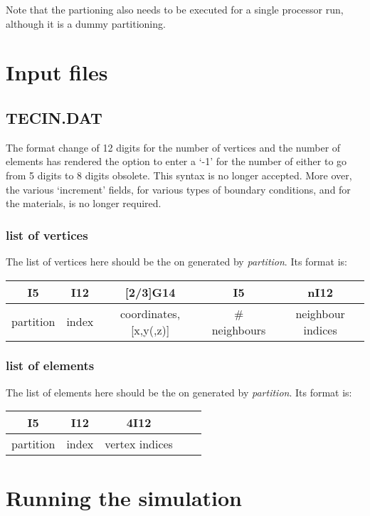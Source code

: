\documentclass{article}
\begin{document}
Note that the partioning also needs to be executed for a single processor run, although it is a dummy partitioning.


\section{Input files}


\subsection{TECIN.DAT}

The format change of 12 digits for the number of vertices and the number of elements has rendered
the option to enter a `-1' for the number of either to go from 5 digits to 8 digits obsolete.
This syntax is no longer accepted. More over, the various `increment' fields, for various types of boundary conditions, and for the materials,
is no longer required.


\subsubsection{list of vertices}

The list of vertices here should be the on generated by \textit{partition}. Its format is:

\begin{tabular}{|c|c|c|c|c|}
\hline
I5 & I12 & [2/3]G14 & I5 & nI12 \\
\hline
partition & index & coordinates, [x,y(,z)] & \# neighbours & neighbour indices \\
\hline
\end{tabular}

\subsubsection{list of elements}

The list of elements here should be the on generated by \textit{partition}. Its format is:

\begin{tabular}{|c|c|c|c|c|}
\hline
I5 & I12 & 4I12 \\
\hline
partition & index & vertex indices \\
\hline
\end{tabular}


\section{Running the simulation}
\end{document}
